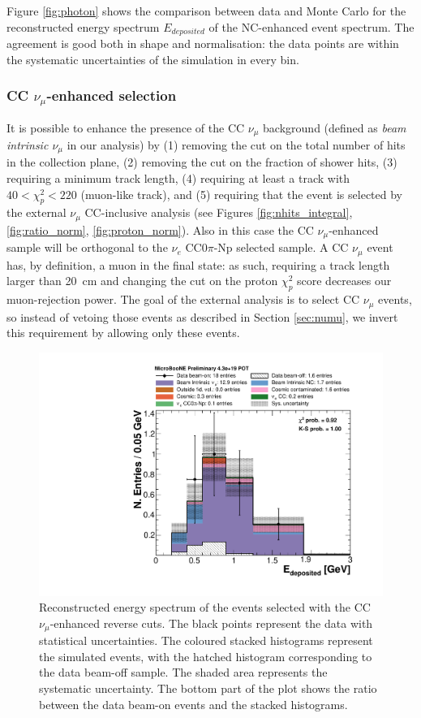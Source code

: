 Figure \ref{fig:photon} shows the comparison between data and Monte Carlo for the reconstructed energy spectrum $E_{deposited}$ of the NC-enhanced event spectrum. The agreement is good both in shape and normalisation: the data points are within the systematic uncertainties of the simulation in every bin.



\subsubsection{CC \texorpdfstring{$\nu_{\mu}$}{numu}-enhanced selection}
It is possible to enhance the presence of the CC $\nu_{\mu}$ background (defined as \emph{beam intrinsic $\nu_{\mu}$} in our analysis) by (1) removing the cut on the total number of hits in the collection plane, (2) removing the cut on the fraction of shower hits, (3) requiring a minimum track length, (4) requiring at least a track with $40 < \chi_p^{2} < 220$ (muon-like track), and (5) requiring that the event is selected by the external $\nu_{\mu}$ CC-inclusive analysis \cite{ubxsec} (see Figures \ref{fig:nhits_integral}, \ref{fig:ratio_norm}, \ref{fig:proton_norm}). Also in this case the CC $\nu_{\mu}$-enhanced sample will be orthogonal to the $\nu_{e}$ CC0$\pi$-Np selected sample.
A CC $\nu_{\mu}$ event has, by definition, a muon in the final state: as such, requiring a track length larger than 20~cm and changing the cut on the proton $\chi^2_p$ score decreases our muon-rejection power. The goal of the external analysis is to select CC $\nu_{\mu}$ events, so instead of vetoing those events as described in Section \ref{sec:numu}, we invert this requirement by allowing only these events.

\begin{figure}[htbp]
\centering
  \includegraphics[width=0.7\linewidth]{figures/numu_reco.pdf}
  \caption{Reconstructed energy spectrum of the events selected with the CC~$\nu_{\mu}$-enhanced reverse cuts. The black points represent the data with statistical uncertainties. The coloured stacked histograms represent the simulated events, with the hatched histogram corresponding to the data beam-off sample. The shaded area represents the systematic uncertainty. The bottom part of the plot shows the ratio between the data beam-on events and the stacked histograms.}\label{fig:numu_inverted}
\end{figure}

